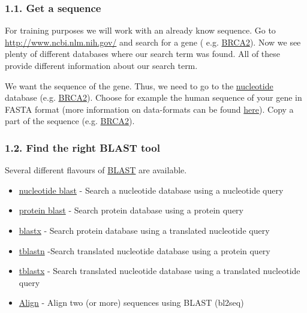 \documentclass[]{article}
\begin{document}
\subsubsection{1.1. Get a sequence}\label{get-a-sequence}

For training purposes we will work with an already know sequence. Go to
\url{http://www.ncbi.nlm.nih.gov/} and search for a gene ( e.g.
\href{http://www.ncbi.nlm.nih.gov/gquery/?term=BRCA2}{BRCA2}). Now we
see plenty of different databases where our search term was found. All
of these provide different information about our search term.

We want the sequence of the gene. Thus, we need to go to the
\href{http://www.ncbi.nlm.nih.gov/nuccore}{nucleotide} database (e.g.
\href{http://www.ncbi.nlm.nih.gov/nuccore/?term=BRCA2}{BRCA2}). Choose
for example the human sequence of your gene in FASTA format (more
information on data-formats can be found
\href{http://compbio.massey.ac.nz/wiki/\#!bioinf_files.md}{here}). Copy
a part of the sequence (e.g.
\href{http://www.ncbi.nlm.nih.gov/nuccore/1161383?report=fasta}{BRCA2}).

\subsubsection{1.2. Find the right BLAST
tool}\label{find-the-right-blast-tool}

Several different flavours of
\href{http://blast.ncbi.nlm.nih.gov/}{BLAST} are available.

\begin{itemize}
\itemsep1pt\parskip0pt
\item
  \href{http://blast.ncbi.nlm.nih.gov/Blast.cgi?PROGRAM=blastn\&PAGE_TYPE=BlastSearch\&LINK_LOC=blasthome}{nucleotide
  blast} - Search a nucleotide database using a nucleotide query
\item
  \href{http://blast.ncbi.nlm.nih.gov/Blast.cgi?PROGRAM=blastp\&PAGE_TYPE=BlastSearch\&LINK_LOC=blasthome}{protein
  blast} - Search protein database using a protein query
\item
  \href{http://blast.ncbi.nlm.nih.gov/Blast.cgi?PROGRAM=blastx\&PAGE_TYPE=BlastSearch\&LINK_LOC=blasthome}{blastx}
  - Search protein database using a translated nucleotide query
\item
  \href{http://blast.ncbi.nlm.nih.gov/Blast.cgi?PROGRAM=tblastn\&PAGE_TYPE=BlastSearch\&LINK_LOC=blasthome}{tblastn}
  -Search translated nucleotide database using a protein query
\item
  \href{http://blast.ncbi.nlm.nih.gov/Blast.cgi?PROGRAM=tblastx\&PAGE_TYPE=BlastSearch\&LINK_LOC=blasthome}{tblastx}
  - Search translated nucleotide database using a translated nucleotide
  query
\item
  \href{http://blast.ncbi.nlm.nih.gov/Blast.cgi?PAGE_TYPE=BlastSearch\&BLAST_SPEC=blast2seq\&LINK_LOC=align2seq}{Align}
  - Align two (or more) sequences using BLAST (bl2seq)
\end{itemize}
\end{document}
